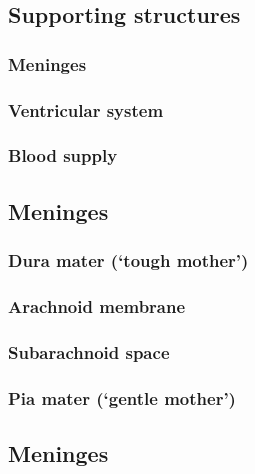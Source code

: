 \documentclass[]{article}
\begin{document}
\subsection{Supporting structures}\label{supporting-structures}

\subsubsection{Meninges}\label{meninges}

\subsubsection{Ventricular system}\label{ventricular-system}

\subsubsection{Blood supply}\label{blood-supply}

\subsection{Meninges}\label{meninges-1}

\subsubsection{\texorpdfstring{Dura mater (`tough
mother')}{Dura mater (tough mother)}}\label{dura-mater-tough-mother}

\subsubsection{Arachnoid membrane}\label{arachnoid-membrane}

\subsubsection{Subarachnoid space}\label{subarachnoid-space}

\subsubsection{\texorpdfstring{Pia mater (`gentle
mother')}{Pia mater (gentle mother)}}\label{pia-mater-gentle-mother}

\subsection{Meninges}\label{meninges-2}
\end{document}
